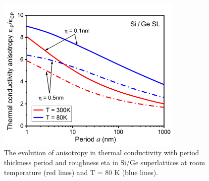 \begin{figure}[hbt]
  \centering \includegraphics[width=0.80\textwidth]{figures/ch6/Fig7.jpg}
  \caption{The evolution of anisotropy in thermal conductivity with period thickness \gls{period} and roughness \gls{eta} in Si/Ge superlattices at room temperature (red lines) and \gls{T} = 80 K (blue lines).}
  \label{fig:ch6-7}
\end{figure}

